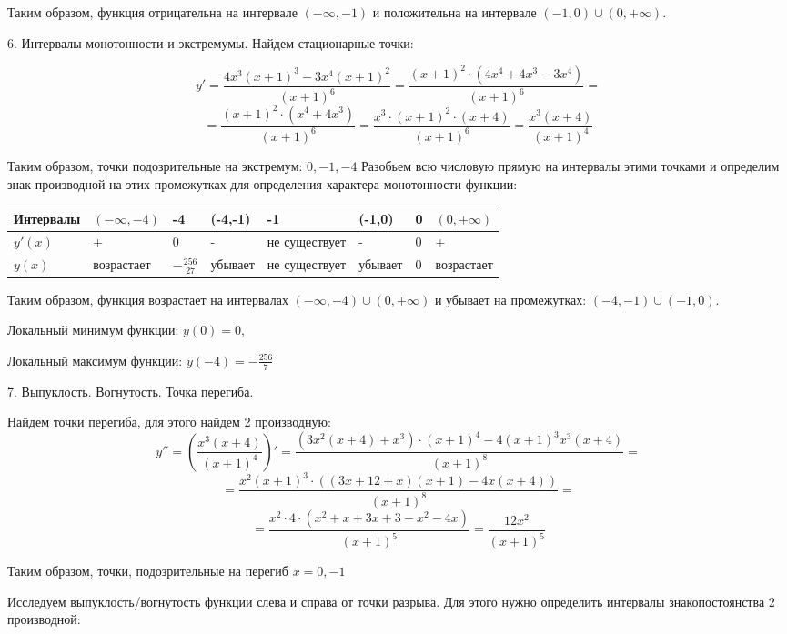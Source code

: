 Таким образом, функция отрицательна на интервале $(-\infty, -1)$ и положительна на интервале $(-1,0) \cup (0, + \infty)$.

6. Интервалы монотонности и экстремумы.
Найдем стационарные точки:

\[
    y' = \frac{4x^3(x+1)^3 - 3x^4(x+1)^2}{(x+1)^6} = \frac{(x+1)^2 \cdot (4x^4 + 4x^3 - 3x^4)}{(x+1)^6} = 
\]
\[
    =\frac{(x+1)^2 \cdot(x^4 + 4x^3)}{(x+1)^6} = \frac{x^3 \cdot (x+1)^2 \cdot (x+4)}{(x+1)^6} = \frac{x^3(x+4)}{(x+1)^4}
\]

Таким образом, точки подозрительные на экстремум: $0, -1, -4$
Разобьем всю числовую прямую на интервалы этими точками и определим знак производной на этих промежутках для определения характера монотонности функции:

\begin{table}[h]
\begin{tabular}{|l|l|l|l|l|l|l|l|}
\hline
Интервалы & $(- \infty, -4)$ & -4                & (-4,-1) & -1            & (-1,0)  & 0 & $(0,+\infty)$ \\ \hline
$y'(x)$   & +                & 0                 & -       & не существует & -       & 0 & +                          \\ \hline
$y(x)$    & возрастает       & $-\frac{256}{27}$ & убывает & не существует & убывает & 0 & возрастает                 \\ \hline
\end{tabular}
\end{table}

Таким образом, функция возрастает на интервалах $(-\infty,-4) \cup (0,+\infty)$ и убывает на промежутках: $(-4,-1) \cup (-1,0)$. 

Локальный минимум функции: $y(0) = 0$,

Локальный максимум функции: $y(-4) = -\frac{256}{7}$

7. Выпуклость. Вогнутость. Точка перегиба.

Найдем точки перегиба, для этого найдем 2 производную:
\[
    y'' = \left( \frac{x^3(x+4)}{(x+1)^4} \right)' = \frac{(3x^2(x+4)+x^3)\cdot (x+1)^4 - 4(x+1)^3x^3(x+4)}{(x+1)^8} = 
\]
\[
    = \frac{x^2 (x+1)^3\cdot ((3x + 12 + x)(x+1)-4x(x+4))}{(x+1)^8} = 
\]
\[
    =\frac{x^2\cdot4\cdot(x^2+x+3x+3-x^2-4x)}{(x+1)^5} =\frac{12x^2}{(x+1)^5}
\]

Таким образом, точки, подозрительные на перегиб $x=0,-1$

Исследуем выпуклость/вогнутость функции слева и справа от точки разрыва. Для этого нужно определить интервалы знакопостоянства 2 производной:


